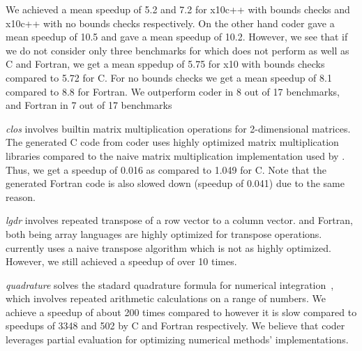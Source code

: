 We achieved a mean speedup of 5.2 and 7.2 for x10c++ with bounds checks and
x10c++ with no bounds checks respectively.  On the other hand \matlab coder gave
a mean speedup of 10.5 and \mctwofor gave a mean speedup of 10.2. However, we
see that if we do not consider only three benchmarks for which \xten does not
perform as well as C and Fortran, we get a mean sppedup of 5.75 for x10 with
bounds checks compared to 5.72 for C. For no bounds checks we get a mean speedup
of 8.1 compared to 8.8 for Fortran.  We outperform \matlab coder in 8 out of 17
benchmarks, and Fortran in 7 out of 17 benchmarks

\emph{clos} involves builtin matrix
multiplication operations for 2-dimensional matrices. The generated C code from
\matlab coder uses highly optimized matrix multiplication libraries compared to
the naive matrix multiplication implementation used by \mixten. Thus, we get a
speedup of 0.016 as compared to 1.049 for C. Note that the generated Fortran
code is also slowed down (speedup of 0.041) due to the same reason.        

\emph{lgdr} involves repeated transpose of a row vector to a column vector.
\matlab and Fortran, both being array languages are highly optimized for
transpose operations. \mixten currently uses a naive transpose algorithm which
is not as highly optimized. However, we still achieved a speedup of over 10 
times. 

\emph{quadrature} solves the stadard quadrature formula for numerical
integration~\cite{}, which involves repeated arithmetic calculations on a range
of numbers. We achieve a speedup of about 200 times compared to \matlab however
it is slow compared to speedups of 3348 and 502 by C and Fortran respectively.
We believe that \matlab coder leverages partial evaluation for optimizing
numerical methods' implementations.

